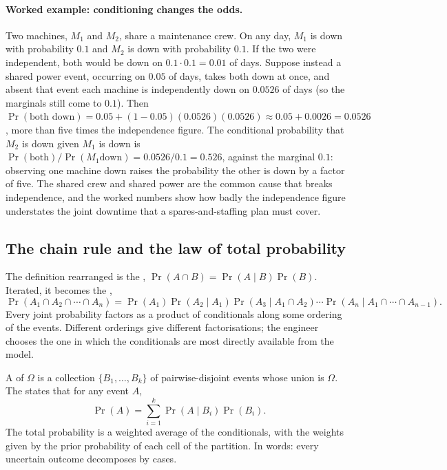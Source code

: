 \paragraph{Worked example: conditioning changes the odds.} Two
machines, $M_{1}$ and $M_{2}$, share a maintenance crew. On any
day, $M_{1}$ is down with probability $0.1$ and $M_{2}$ is down with
probability $0.1$. If the two were independent, both would be down
on $0.1 \cdot 0.1 = 0.01$ of days. Suppose instead a shared power
event, occurring on $0.05$ of days, takes both down at once, and
absent that event each machine is independently down on $0.0526$ of
days (so the marginals still come to $0.1$). Then
$\Pr(\text{both down}) = 0.05 + (1 - 0.05)(0.0526)(0.0526)
\approx 0.05 + 0.0026 = 0.0526$, more than five times the
independence figure. The conditional probability that $M_{2}$ is
down given $M_{1}$ is down is $\Pr(\text{both})/\Pr(M_{1}\text{
down}) = 0.0526/0.1 = 0.526$, against the marginal $0.1$:
observing one machine down raises the probability the other is down
by a factor of five. The shared crew and shared power are the common
cause that breaks independence, and the worked numbers show how
badly the independence figure understates the joint downtime that a
spares-and-staffing plan must cover.

\subsection{The chain rule and the law of total probability}

The definition rearranged is the ,
$\Pr(A \cap B) = \Pr(A \mid B) \Pr(B)$. Iterated, it becomes the
,
\[
\Pr(A_{1} \cap A_{2} \cap \cdots \cap A_{n}) =
\Pr(A_{1}) \Pr(A_{2} \mid A_{1}) \Pr(A_{3} \mid A_{1} \cap A_{2})
\cdots \Pr(A_{n} \mid A_{1} \cap \cdots \cap A_{n-1}).
\]
Every joint probability factors as a product of conditionals along
some ordering of the events. Different orderings give different
factorisations; the engineer chooses the one in which the
conditionals are most directly available from the model.

A  of $\Omega$ is a collection $\{B_{1}, \ldots,
B_{k}\}$ of pairwise-disjoint events whose union is $\Omega$. The
 states that for any event $A$,
\[
\Pr(A) = \sum_{i=1}^{k} \Pr(A \mid B_{i}) \Pr(B_{i}).
\]
The total probability is a weighted average of the conditionals,
with the weights given by the prior probability of each cell of the
partition. In words: every uncertain outcome decomposes by cases.

